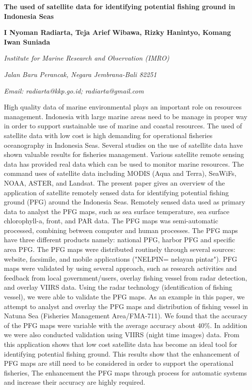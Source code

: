 {
	\begin{center}
	{\large \bfseries The used of satellite data for identifying potential fishing ground in Indonesia Seas\par}
	\vspace{0.5 cm}
	{\bfseries I Nyoman Radiarta, Teja Arief Wibawa, Rizky Hanintyo, Komang Iwan Suniada\par}
	{\itshape Institute for Marine Research and Observation (IMRO)\par}
	{\itshape Jalan Baru Perancak, Negara Jembrana-Bali 82251\par}
	{\itshape Email: radiarta@kkp.go.id; radiarta@gmail.com\par}
	\end{center}
	{\tab High quality data of marine environmental plays an important role on resources management. Indonesia with large marine areas need to be manage in proper way in order to support sustainable use of marine and coastal resources. The used of satellite data with low cost is high demanding for operational fisheries oceanography in Indonesia Seas. Several studies on the use of satellite data have shown valuable results for fisheries management. Various satellite remote sensing data has provided real data which can be used to monitor marine resources. The command uses of satellite data including MODIS (Aqua and Terra), SeaWiFs, NOAA, ASTER, and Landsat. The present paper gives an overview of the application of satellite remotely sensed data for identifying potential fishing ground (PFG) around the Indonesia Seas. Remotely sensed data used as primary data to analyst the PFG maps, such as sea surface temperature, sea surface chlorophyll-a, front, and PAR data. The PFG maps was semi-automatic processed, combining between computer and human processes. The PFG maps have three different products namely: national PFG, harbor PFG and specific area PFG. The PFG maps were distributed routinely through several sources: website, facsimile, and mobile applications ("NELPIN= nelayan pintar"). PFG maps were validated by using several approach, such as research activities and feedback from local government/users, overlay fishing vessel from radar detection, and overlay VIIRS data. Using the radar technology (identification of fishing vessel), we were able to validate the PFG maps. As an example in this paper, we attempt to analyst and overlay the PFG maps and distribution of fishing vessel in Natuna Sea (Fisheries Management Area/FMA-711). We found that the accuracy of the PFG maps were variable with the average accuracy about 40\%. In addition we were also conducted validation using VIIRS (night time images) data. From this application shows that low cost satellite data has become an ideal tool for identifying potential fishing ground. This results show that the enhancement of PFG maps are still need to be considered in order to support the operational fisheries, The enhancement the PFG maps through process for automatic systems and increase their accuracy are highly required.\par}
}
